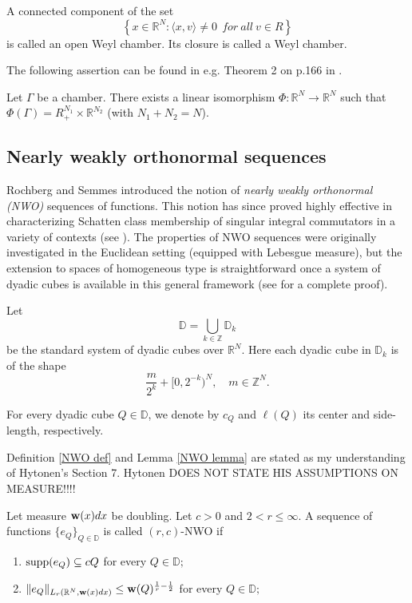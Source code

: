 \documentclass{amsart}
\begin{document}
\begin{definition} A connected component of the set
$$\left\{x\in\mathbb{R}^N:\langle x,v\rangle \neq 0\ \ { for} \ { all} \ v\in R\right\}$$
is called an open Weyl chamber. Its closure is called a Weyl chamber.
\end{definition}

The following assertion can be found in e.g. Theorem 2 on p.166 in \cite{Bourbaki}.

\begin{theorem}\label{phi theorem} Let $\Gamma$ be a chamber. There exists a linear isomorphism $\Phi:\mathbb{R}^N\to\mathbb{R}^N$ such that $\Phi(\Gamma)=R_+^{N_1}\times\mathbb{R}^{N_2}$ (with $N_1+N_2=N$).
\end{theorem}


\subsection{Nearly weakly  orthonormal sequences}
Rochberg and Semmes \cite{RS} introduced the notion of \emph{nearly weakly  orthonormal (NWO)} sequences of functions. This notion has since proved highly effective in characterizing Schatten class membership of  singular integral commutators in a variety of contexts (see \cite{HKarxiv,MR4756021,MR4552581,MR4873796,LLW,RS,Zhangwei1,Zhangwei2}). The properties of NWO sequences were originally investigated in the Euclidean setting (equipped with Lebesgue measure), but the extension to spaces of homogeneous type is straightforward once a system of dyadic cubes is available in this general framework (see \cite[Section 13]{HKarxiv} for a complete proof).

\begin{nota}\label{standardsystem}
Let
$$\mathbb{D}=\bigcup_{k\in\mathbb{Z}}\mathbb{D}_k$$
be the standard system of dyadic cubes over $\mathbb{R}^N.$ Here each dyadic cube in $\mathbb{D}_k$ is of the shape
$$\frac{m}{2^k}+[0,2^{-k})^N,\quad m\in\mathbb{Z}^N.$$

For every dyadic cube $Q\in\mathbb{D}$, we denote by $c_Q$ and $\ell(Q)$ its center and side-length, respectively.
\end{nota}


{\color{red} Definition \ref{NWO def} and Lemma \ref{NWO lemma} are stated as my understanding of Hytonen's Section 7. Hytonen DOES NOT STATE HIS ASSUMPTIONS ON MEASURE!!!!}

\begin{definition}\label{NWO def} Let measure ${\bf w}(x)dx$ be doubling. Let $c>0$ and $2<r\leq\infty.$ A sequence of functions $\{e_Q\}_{Q\in\mathbb{D}}$ is called $(r,c)$-NWO if
\begin{enumerate}[{\rm (i)}]
\item ${\rm supp}(e_Q)\subseteq cQ$ for every $Q\in\mathbb{D};$
\item $\|e_Q\|_{L_r(\mathbb{R}^N,{\bf w}(x)dx)}\leq {\bf w}(Q)^{\frac1r-\frac12}$ for every $Q\in\mathbb{D};$
\end{enumerate}
\end{definition}
\end{document}
